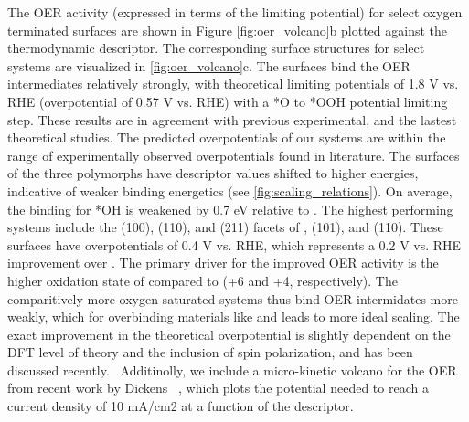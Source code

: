 %
The OER activity (expressed in terms of the limiting potential) for select oxygen terminated surfaces are shown in Figure \ref{fig:oer_volcano}b plotted against the \DGOmOH thermodynamic descriptor.
%
The corresponding surface structures for select systems are visualized in \ref{fig:oer_volcano}c.
%
The \rIrOtwo surfaces bind the OER intermediates relatively strongly,
with theoretical limiting potentials of \mytilde\num{1.8} V vs. RHE (overpotential of 0.57 V vs. RHE) with a *O to *OOH potential limiting step.
%
These results are in agreement with previous experimental, and the lastest theoretical studies.
%
The predicted overpotentials of our \rIrOtwo systems are within the range of experimentally observed overpotentials found in literature.
%
The surfaces of the three \IrOthree polymorphs have \DGOmOH descriptor values shifted to higher energies, indicative of weaker binding energetics (see \ref{fig:scaling_relations}).
%
On average, the binding for *OH is weakened by 0.7 eV relative to \IrOtwo.
%
The highest performing systems include the (100), (110), and (211) facets of \aIrOthree, \bIrOthree (101), and \rIrOthree (110).
%
These surfaces have overpotentials of \mytilde\num{0.4} V vs. RHE,
which represents a \mytilde\num{0.2} V vs. RHE improvement over \rIrOtwo.
%
The primary driver for the improved OER activity is the higher oxidation state of \IrOthree compared to \IrOtwo (+6 and +4, respectively).
%
The comparitively more oxygen saturated \IrOthree systems thus bind OER intermidates more weakly, which for overbinding materials like \IrOtwo and \RhOtwo leads to more ideal scaling.
%
The exact improvement in the theoretical overpotential is slightly dependent on the DFT level of theory and the inclusion of spin polarization, and has been discussed recently.~\cite{Seitz2016,Strickler2019}
%
Additinolly, we include a micro-kinetic volcano for the OER from recent work by Dickens ~\cite{Dickens2019},
which plots the potential needed to reach a current density of 10 mA/cm2 at a function of the \DGOmOH descriptor.
%
%
%
